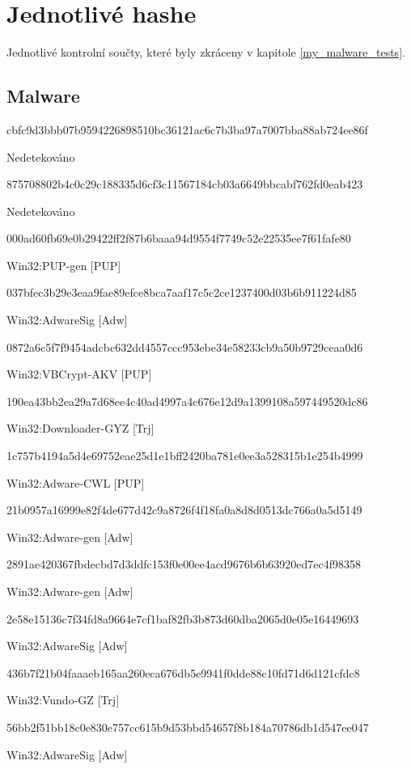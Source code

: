 \documentclass[czech,master,dept460,male,cpp,cpdeclaration]{diploma}
\begin{document}
\section{Jednotlivé hashe}

Jednotlivé kontrolní součty, které byly zkráceny v kapitole \ref{my_malware_tests}.

\subsection{Malware}
cbfc9d3bbb07b9594226898510bc36121ac6c7b3ba97a7007bba88ab724ee86f

Nedetekováno

\noindent
875708802b4c0c29c188335d6cf3c11567184cb03a6649bbcabf762fd0eab423

Nedetekováno

\noindent
000ad60fb69e0b29422ff2f87b6baaa94d9554f7749c52e22535ee7f61fafe80

Win32:PUP-gen [PUP]

\noindent
037bfec3b29e3eaa9fae89efce8bca7aaf17c5c2ce1237400d03b6b911224d85

Win32:AdwareSig [Adw]

\noindent
0872a6c5f7f9454adcbc632dd4557ccc953ebe34e58233cb9a50b9729ceaa0d6

Win32:VBCrypt-AKV [PUP]

\noindent
190ea43bb2ea29a7d68ee4c40ad4997a4c676e12d9a1399108a597449520dc86

Win32:Downloader-GYZ [Trj]

\noindent
1c757b4194a5d4e69752eae25d1e1bff2420ba781e0ee3a528315b1e254b4999

Win32:Adware-CWL [PUP]

\noindent
21b0957a16999e82f4de677d42c9a8726f4f18fa0a8d8d0513dc766a0a5d5149

Win32:Adware-gen [Adw]

\noindent
2891ae420367fbdecbd7d3ddfc153f0e00ee4acd9676b6b63920ed7ec4f98358

Win32:Adware-gen [Adw]

\noindent
2e58e15136c7f34fd8a9664e7cf1baf82fb3b873d60dba2065d0e05e16449693

Win32:AdwareSig [Adw]

\noindent
436b7f21b04faaaeb165aa260eca676db5e9941f0dde88c10fd71d6d121cfdc8

Win32:Vundo-GZ [Trj]

\noindent
56bb2f51bb18c0e830e757cc615b9d53bbd54657f8b184a70786db1d547ee047

Win32:AdwareSig [Adw]
\end{document}

